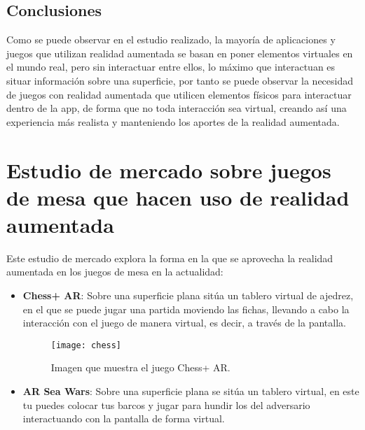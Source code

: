 \begin{itemize}
\begin{itemize}
\begin{itemize}
\begin{itemize}
  \end{itemize}
\end{itemize}

\subsection{Conclusiones}
Como se puede observar en el estudio realizado, la mayoría de aplicaciones y juegos que utilizan realidad aumentada se basan en poner elementos virtuales en el mundo real, pero sin interactuar entre ellos, lo máximo que interactuan es situar información sobre una superficie, por tanto se puede observar la necesidad de juegos con realidad aumentada que utilicen elementos físicos para interactuar dentro de la app, de forma que no toda interacción sea virtual, creando así una experiencia más realista y manteniendo los aportes de la realidad aumentada.



\section{Estudio de mercado sobre juegos de mesa que hacen uso de realidad aumentada}

Este estudio de mercado explora la forma en la que se aprovecha la realidad aumentada en los juegos de mesa en la actualidad:

\begin{itemize}
  \item \textbf{Chess+ AR}: Sobre una superficie plana sitúa un tablero virtual de ajedrez, en el que se puede jugar una partida moviendo las fichas, llevando a cabo la interacción con el juego de manera virtual, es decir, a través de la pantalla.

  \begin{figure}[h]
    \centering
    \texttt{[image: chess]}
    \caption{Imagen que muestra el juego Chess+ AR.\protect\footnotemark}
    \label{figura-siege-breakers}
  \end{figure}


  \newpage

  \item \textbf{AR Sea Wars}: Sobre una superficie plana se sitúa un tablero virtual, en este tu puedes colocar tus barcos y jugar para hundir los del adversario interactuando con la pantalla de forma virtual.


\end{itemize}
\end{itemize}
\end{itemize}
